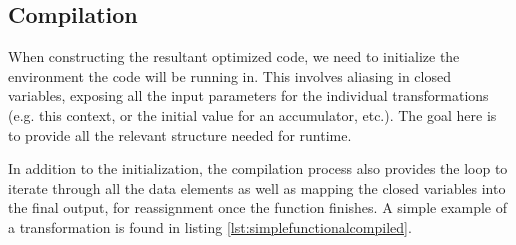\subsection{Compilation}\label{Compilation}
When constructing the resultant optimized code, we need to initialize the environment the code will be running in.  This involves aliasing in closed variables, exposing all the input parameters for the individual transformations (e.g. this context, or the initial value for an accumulator, etc.).  The goal here is to provide all the relevant structure needed for runtime.  

In addition to the initialization, the compilation process also provides the  loop to iterate through all the data elements as well as mapping the closed variables into the final output, for reassignment once the function finishes.  A simple example of a transformation is found in listing \ref{lst:simplefunctionalcompiled}.

\begin{minipage}{\linewidth}

\end{minipage}
